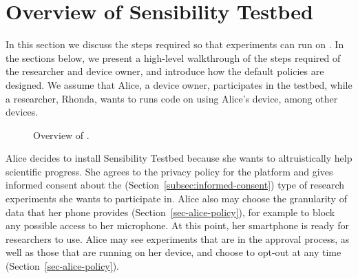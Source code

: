 \section{Overview of Sensibility Testbed}\label{sec-overview}

In this section we discuss the steps required so that experiments 
can run on \sysname. 
%
In the sections below, we present a high-level walkthrough of the steps 
required of the researcher and device owner, and 
introduce how the default policies are designed. 
We assume that Alice, a device owner, participates in 
the testbed, while a researcher, Rhonda, wants to runs code on \sysname 
using Alice's device, among other devices.


\begin{figure}
\caption{\small Overview of \sysname. \label{fig-walkthrough}}
\end{figure}

Alice decides to install Sensibility Testbed because she wants to 
altruistically help scientific progress.  She agrees to the privacy
policy for the platform and gives informed consent about the (Section~\ref{subsec:informed-consent})
type of research experiments she wants to participate in.  Alice also
may choose the granularity of data that her phone provides (Section~\ref{sec-alice-policy}), for 
example to block any possible access to her microphone.  At this point,
her smartphone is ready for researchers to use.  Alice may see experiments 
that are in the approval process, as
well as those that are running on her device, and choose
to opt-out at any time (Section~\ref{sec-alice-policy}). 

